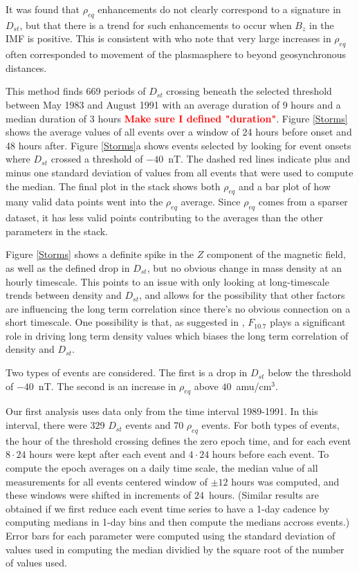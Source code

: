 \documentclass[10pt,twocolumn]{article}
\newcommand{\vinote}[1]{\textcolor{red}{\textbf{#1}}} %
\newcommand{\inote}[1]{\textcolor{blue}{\textbf{#1}}} %
\def\note#1\par{\textcolor{blue}{\textbf{#1}}\\}
\begin{document}
It was found that $\rho_{eq}$ enhancements do not clearly correspond to a signature in $D_{st}$, but that there is a trend for such enhancements to occur when $B_{z}$ in the IMF is positive.  This is consistent with \cite{Takahashi2010} who note that very large increases in $\rho_{eq}$ often corresponded to movement of the plasmasphere to beyond geosynchronous distances. 

This method finds 669 periods of $D_{st}$ crossing beneath the selected threshold between May 1983 and August 1991 with an average duration of 9 hours and a median duration of 3 hours \vinote{Make sure I defined "duration"}. Figure \ref{Storms} shows the average values of all events over a window of 24 hours before onset and 48 hours after. Figure \ref{Storms}a shows events selected by looking for event onsets where $D_{st}$ crossed a threshold of $-40$~nT. The dashed red lines indicate plus and minus one standard deviation of values from all events that were used to compute the median. The final plot in the stack shows both $\rho_{eq}$ and a bar plot of how many valid data points went into the $\rho_{eq}$ average. Since $\rho_{eq}$ comes from a sparser dataset, it has less valid points contributing to the averages than the other parameters in the stack. 

Figure \ref{Storms} shows a definite spike in the $Z$ component of the magnetic field, as well as the defined drop in $D_{st}$, but no obvious change in mass density at an hourly timescale. This points to an issue with only looking at long-timescale trends between density and $D_{st}$, and allows for the possibility that other factors are influencing the long term correlation since there's no obvious connection on a short timescale. One possibility is that, as suggested in \cite{Takahashi2010}, $F_{10.7}$ plays a significant role in driving long term density values which biases the long term correlation of density and $D_{st}$.

Two types of events are considered. The first is a drop in $D_{st}$ below the threshold of $-40$~nT.  The second is an increase in $\rho_{eq}$ above $40$~amu/cm$^3$.

Our first analysis uses data only from the time interval 1989-1991.  In this interval, there were 329 $D_{st}$ events and 70 $\rho_{eq}$ events.  For both types of events, the hour of the threshold crossing defines the zero epoch time, and for each event $8\cdot24$ hours were kept after each event and $4\cdot24$ hours before each event.  To compute the epoch averages on a daily time scale, the median value of all measurements for all events centered window of $\pm 12$ hours was computed, and these windows were shifted in increments of $24$~hours. (Similar results are obtained if we first reduce each event time series to have a 1-day cadence by computing medians in 1-day bins and then compute the medians accross events.)  Error bars for each parameter were computed using the standard deviation of values used in computing the median dividied by the square root of the number of values used.
\end{document}
